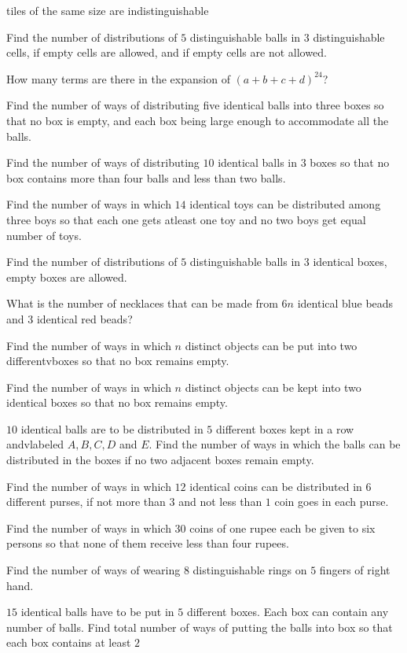   tiles of the same size are indistinguishable
\item Find the number of distributions of $5$ distinguishable balls in $3$ distinguishable cells, if empty
  cells are allowed, and if empty cells are not allowed.
\item How many terms are there in the expansion of $(a + b + c + d)^{24}$?
\item Find the number of ways of distributing five identical balls into three boxes so that no box is empty,
  and each box being large enough to accommodate all the balls.
\item Find the number of ways of distributing $10$ identical balls in $3$ boxes so that no box contains more
  than four balls and less than two balls.
\item Find the number of ways in which $14$ identical toys can be distributed among three boys so that each
  one gets atleast one toy and no two boys get equal number of toys.
\item Find the number of distributions of $5$ distinguishable balls in $3$ identical boxes, empty boxes are
  allowed.
\item What is the number of necklaces that can be made from $6n$ identical blue beads and $3$ identical red
  beads?
\item Find the number of ways in which $n$ distinct objects can be put into two differentvboxes so that no
  box remains empty.
\item Find the number of ways in which $n$ distinct objects can be kept into two identical boxes so that no
  box remains empty.
\item $10$ identical balls are to be distributed in $5$ different boxes kept in a row andvlabeled $A, B, C,
  D$ and $E$. Find the number of ways in which the balls can be distributed in the boxes if no two adjacent
  boxes remain empty.
\item Find the number of ways in which $12$ identical coins can be distributed in $6$ different purses, if
  not more than $3$ and not less than $1$ coin goes in each purse.
\item Find the number of ways in which $30$ coins of one rupee each be given to six persons so that none of
  them receive less than four rupees.
\item Find the number of ways of wearing $8$ distinguishable rings on $5$ fingers of right hand.
\item $15$ identical balls have to be put in $5$ different boxes. Each box can contain any number of
  balls. Find total number of ways of putting the balls into box so that each box contains at least $2$
